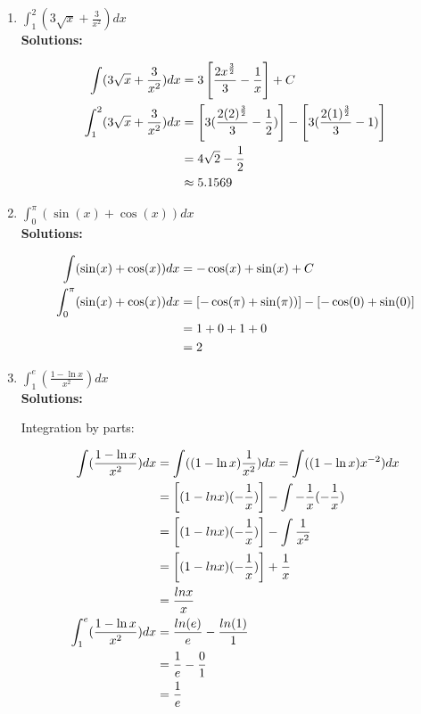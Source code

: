 \documentclass[a4paper]{article}
\begin{document}
\begin{enumerate}
\begin{enumerate}
	
	\item $\int_{1}^2(3\sqrt{x} + \frac{3}{x^2})dx$\\
	
	\textbf{Solutions:}
	
\begin{align}
	\int(3\sqrt{x} + \frac{3}{x^2})dx &= 3 \left[ \frac{2x^\frac{3}{2}}{3} - \frac{1}{x}\right] + C\notag\\
	\int_{1}^2(3\sqrt{x} + \frac{3}{x^2})dx &= \left[ 3(\frac{2(2)^\frac{3}{2}}{3} - \frac{1}{2})\right] - \left[ 3(\frac{2(1)^\frac{3}{2}}{3} - 1) \right]\notag\\
	&= 4\sqrt{2} - \frac{1}{2}\notag\\
	&\approx 5.1569\notag
\end{align}		
	
	
	\item $\int_{0}^\pi(\sin(x) + \cos(x))dx$\\
	
	\textbf{Solutions:}	

\begin{align}
	\int(\sin(x) + \cos(x))dx &= -\cos(x) + \sin(x) + C\notag\\
	\int_{0}^\pi(\sin(x) + \cos(x))dx &= \left[ -\cos(\pi) + \sin(\pi))\right] - \left[ -\cos(0) + \sin(0)\right]\notag\\
	&= 1 + 0 + 1 + 0\notag\\
	&= 2\notag
\end{align}		




	\item $\int_{1}^e(\frac{1 - \ln x}{x^2})dx$\\
	
	\textbf{Solutions:}	

Integration by parts:

\begin{align}
	\int(\frac{1 - \ln x}{x^2})dx &=  \int((1 - \ln x)\frac{1}{x^2})dx = \int((1 - \ln x)x^{-2})dx \notag\\
	&= \left[ (1 - ln x) (-\frac{1}{x})\right] - \int -\frac{1}{x} (-\frac{1}{x})\notag\\
	&= \left[ (1 - ln x) (-\frac{1}{x})\right] - \int \frac{1}{x^2}\notag\\
	&= \left[ (1 - ln x) (-\frac{1}{x})\right] + \frac{1}{x}\notag\\
	&= \frac{ln x}{x}\notag\\
	\int_{1}^e(\frac{1 - \ln x}{x^2})dx &= \frac{ln(e)}{e} - \frac{ln(1)}{1}\notag\\
	&= \frac{1}{e} - \frac{0}{1}\notag\\
	&= \frac{1}{e}\notag
\end{align}		




\end{enumerate}
\end{enumerate}
\end{document}
